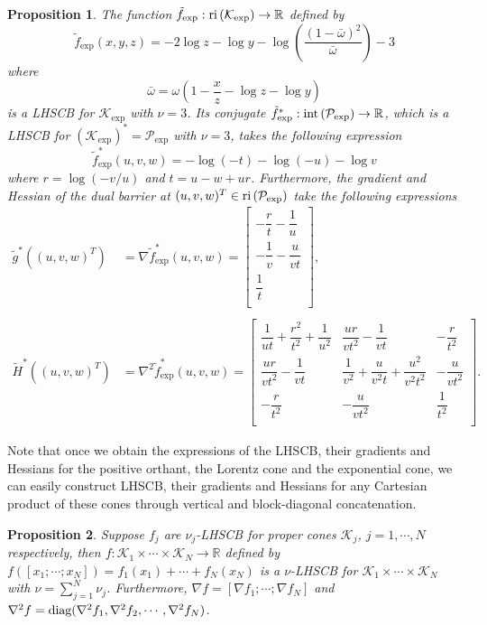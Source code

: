 \documentclass[10pt]{article}
\theoremstyle{definition}
\theoremstyle{plain}
\newtheorem{prop}{Proposition}
\def\interior{\protect{\textnormal{ri}}}
\def\relint{\protect{\textnormal{ri}}}
\def\diagonal{\protect{\textnormal{diag}}}
\begin{document}
\begin{prop}
	The function $\tilde{f}_{\exp}: \relint\left(\mathcal{K}_{\exp}\right)\rightarrow \mathbb{R}$ defined by
	\[\tilde{f}_{\exp}(x,y,z) = -2 \log z - \log y  - \log \left(\dfrac{(1-\bar{\omega})^2}{\bar{\omega}}\right) - 3 \]
	where 
	\[\bar{\omega} = \omega\left(1-\dfrac{x}{z} - \log z - \log y\right) \]
	is a LHSCB for $\mathcal{K}_{\exp}$ with $\nu = 3$. Its conjugate $\tilde{f}_{\exp}^*: \textnormal{int}\left(\mathcal{P}_{\exp}\right) \rightarrow \mathbb{R}$, which is a LHSCB for $\left(\mathcal{K}_{\exp}\right)^* = \mathcal{P}_{\exp}$ with $\nu=3$, takes the following expression 
	\[\tilde{f}_{\exp}^*(u,v,w) = -\log\left(-t\right) - \log (-u) - \log v\]
	where $r = \log \left(-v/u\right)$ and $t=u-w+ur$.  Furthermore, the gradient and Hessian of the dual barrier at $(u,v,w)^T \in \interior\left(\mathcal{P}_{\exp}\right)$ take the following expressions \\
	\begin{align*}
	\tilde{g}^*\left((u,v,w)^T\right) &= \nabla \tilde{f}^*_{\exp}(u,v,w) =  
	\begin{bmatrix}
	-\dfrac{r}{t} - \dfrac{1}{u} \\[2ex]
	-\dfrac{1}{v} - \dfrac{u}{vt} \\[2ex]
	\dfrac{1}{t} \\[1ex]
	\end{bmatrix}, \\ \\
	\tilde{H}^*\left((u,v,w)^T\right) &= \nabla^2 \tilde{f}^*_{\exp}(u,v,w) =  
	\begin{bmatrix}
	\dfrac{1}{ut} + \dfrac{r^2}{t^2}+ \dfrac{1}{u^2} & \dfrac{ur}{vt^2} - \dfrac{1}{vt} & -\dfrac{r}{t^2} \\[2ex]
	\dfrac{ur}{vt^2} - \dfrac{1}{vt}  & \dfrac{1}{v^2}+\dfrac{u}{v^2t} + \dfrac{u^2}{v^2t^2} & -\dfrac{u}{vt^2} \\[2ex]
	-\dfrac{r}{t^2}	& -\dfrac{u}{vt^2} & \dfrac{1}{t^2} \\[1.5ex]
	\end{bmatrix}.
	\end{align*}
\end{prop}
Note that once we obtain the expressions of the LHSCB, their gradients and Hessians for the positive orthant, the Lorentz cone and the exponential cone, we can easily construct LHSCB, their gradients and Hessians for any Cartesian product of these cones through vertical and block-diagonal concatenation.
\begin{prop}
	Suppose $f_j$ are $\nu_j$-LHSCB for proper cones $\mathcal{K}_j$, $j = 1,\cdots, N$ respectively, then $f: \mathcal{K}_1 \times\cdots\times \mathcal{K}_N \rightarrow \mathbb{R}$ defined by $f([x_1;\cdots; x_N]) = f_1(x_1) + \cdots + f_N(x_N)$ is a $\nu$-LHSCB for $\mathcal{K}_1 \times \cdots \times \mathcal{K}_N$ with $\nu = \sum_{j=1}^N\nu_j$. Furthermore, $\nabla f = [\nabla f_1; \cdots; \nabla f_N]$ and $\nabla^2 f = \diagonal(\nabla^2 f_1, \nabla^2 f_2, \cdots, \nabla^2 f_N)$.
\end{prop}
\end{document}
